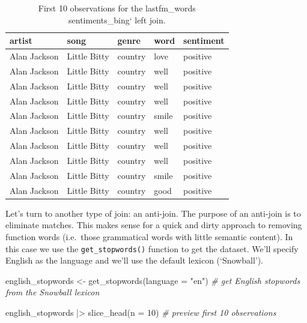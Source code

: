 \documentclass[
  letterpaper,
]{scrbook}
\newenvironment{Shaded}{\begin{snugshade}}{\end{snugshade}}
\newcommand{\AttributeTok}[1]{\textcolor[rgb]{0.00,0.00,0.00}{#1}}
\newcommand{\CommentTok}[1]{\textcolor[rgb]{0.00,0.00,0.00}{\textit{#1}}}
\newcommand{\DecValTok}[1]{\textcolor[rgb]{0.00,0.00,0.00}{#1}}
\newcommand{\FunctionTok}[1]{\textcolor[rgb]{0.00,0.00,0.00}{#1}}
\newcommand{\NormalTok}[1]{\textcolor[rgb]{0.00,0.00,0.00}{#1}}
\newcommand{\OtherTok}[1]{\textcolor[rgb]{0.00,0.00,0.00}{#1}}
\newcommand{\SpecialCharTok}[1]{\textcolor[rgb]{0.00,0.00,0.00}{#1}}
\newcommand{\StringTok}[1]{\textcolor[rgb]{0.00,0.00,0.00}{#1}}
\begin{document}
\begin{table}
\caption{First 10 observations for the lastfm\_words sentiments\_bing` left join.}\tabularnewline

\centering
\begin{tabular}{lllll}
\toprule
artist & song & genre & word & sentiment\\
\midrule
Alan Jackson & Little Bitty & country & love & positive\\
Alan Jackson & Little Bitty & country & well & positive\\
Alan Jackson & Little Bitty & country & well & positive\\
Alan Jackson & Little Bitty & country & well & positive\\
Alan Jackson & Little Bitty & country & smile & positive\\
\addlinespace
Alan Jackson & Little Bitty & country & well & positive\\
Alan Jackson & Little Bitty & country & well & positive\\
Alan Jackson & Little Bitty & country & well & positive\\
Alan Jackson & Little Bitty & country & smile & positive\\
Alan Jackson & Little Bitty & country & good & positive\\
\bottomrule
\end{tabular}
\end{table}

Let's turn to another type of join: an anti-join. The purpose of an
anti-join is to eliminate matches. This makes sense for a quick and
dirty approach to removing function words (i.e.~those grammatical words
with little semantic content). In this case we use the
\texttt{get\_stopwords()} function to get the dataset. We'll specify
English as the language and we'll use the default lexicon (`Snowball').

\begin{Shaded}
\begin{Highlighting}[]
\NormalTok{english\_stopwords }\OtherTok{\textless{}{-}} 
  \FunctionTok{get\_stopwords}\NormalTok{(}\AttributeTok{language =} \StringTok{"en"}\NormalTok{) }\CommentTok{\# get English stopwords from the Snowball lexicon}

\NormalTok{english\_stopwords }\SpecialCharTok{|\textgreater{}} 
  \FunctionTok{slice\_head}\NormalTok{(}\AttributeTok{n =} \DecValTok{10}\NormalTok{) }\CommentTok{\# preview first 10 observations}
\end{Highlighting}
\end{Shaded}
\end{document}
